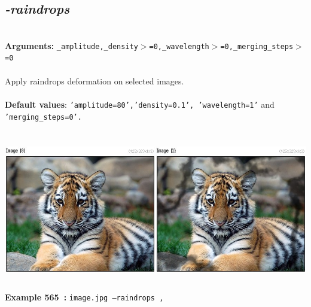 \documentclass[a4paper,11pt,twoside]{book}
\begin{document}
\subsection{\emph{-raindrops} }\vspace*{-0.5em}
~\\\textbf{Arguments: } 
{\small \texttt{\_amplitude,\_density$>$=0,\_wavelength$>$=0,\_merging\_steps$>$=0}}\\~\\
Apply raindrops deformation on selected images.
~\\~\\\textbf{Default values}: {\small \texttt{'amplitude=80','density=0.1', 'wavelength=1'} and \texttt{'merging\_steps=0'.}}
\begin{center}\includegraphics[keepaspectratio=true,height=7cm,width=\textwidth]{img/gmic_def565.jpg}\\
{\footnotesize \textbf{Example 565~:} \texttt{image.jpg --raindrops ,}}
\end{center}
\end{document}
